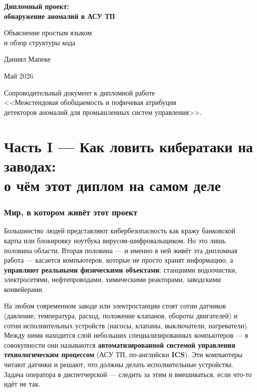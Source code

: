 \documentclass[11pt,a4paper]{article}
\begin{document}
\begin{titlepage}
  \centering
  \vspace*{4cm}
  {\Huge\bfseries Дипломный проект:\\обнаружение аномалий в АСУ ТП\par}
  \vspace{1cm}
  {\Large Объяснение простым языком\\и обзор структуры кода\par}
  \vspace{3cm}
  {\large Даниял Мапеке\par}
  \vspace{0.5cm}
  {\large Май 2026\par}
  \vfill
  {\small Сопроводительный документ к дипломной работе\\
  <<Межстендовая обобщаемость и пофичевая атрибуция\\
  детекторов аномалий для промышленных систем управления>>.\par}
\end{titlepage}

\tableofcontents
\clearpage

\part*{Часть I --- Как ловить кибератаки на заводах:\\о чём этот диплом на самом деле}

\section{Мир, в котором живёт этот проект}

Большинство людей представляют кибербезопасность как кражу банковской карты или блокировку ноутбука вирусом-шифровальщиком. Но это лишь половина области. Вторая половина --- и именно в ней живёт эта дипломная работа --- касается компьютеров, которые не просто хранят информацию, а \textbf{управляют реальными физическими объектами}: станциями водоочистки, электросетями, нефтепроводами, химическими реакторами, заводскими конвейерами.

На любом современном заводе или электростанции стоят сотни датчиков (давление, температура, расход, положение клапанов, обороты двигателей) и сотни исполнительных устройств (насосы, клапаны, выключатели, нагреватели). Между ними находится слой небольших специализированных компьютеров --- в совокупности они называются \textbf{автоматизированной системой управления технологическим процессом} (АСУ ТП, по-английски \textbf{ICS}). Эти компьютеры читают датчики и решают, что должны делать исполнительные устройства. Задача оператора в диспетчерской --- следить за этим и вмешиваться, если что-то идёт не так.
\end{document}
